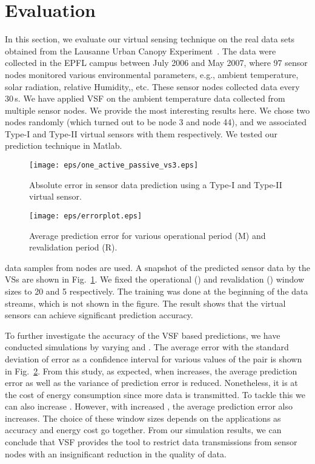 \documentclass[a4paper,conference]{IEEEtran}
\begin{document}
\section{Evaluation}
\label{eva}
In this section, we evaluate our virtual sensing technique on the real data sets obtained from the Lausanne Urban Canopy Experiment~\cite{sensorscope}. The data were collected in the EPFL campus between July 2006 and May 2007, where 97 sensor nodes monitored various environmental parameters, e.g., ambient temperature, solar radiation, relative Humidity,, etc. These sensor nodes collected data every 30\,s. We have applied VSF on the ambient temperature data collected from multiple sensor nodes. We provide the most interesting results here. We chose two nodes randomly (which turned out to be node 3 and node 44), and we associated Type-I and Type-II virtual sensors with them respectively. We tested our prediction technique in Matlab.
\begin{figure}[]
\centering
\texttt{[image: eps/one\_active\_passive\_vs3.eps]}
\caption{Absolute error in sensor data prediction using a Type-I and Type-II virtual sensor.}
\label{fig:prediction}
\end{figure}
\begin{figure}[]
\centering
\texttt{[image: eps/errorplot.eps]}
\caption{Average prediction error for various operational period (M) and revalidation period (R).}
\label{fig:errorplot}
\end{figure}
 data samples from nodes are used. A snapshot of the predicted sensor data by the VSs are shown in Fig.~\ref{fig:prediction}. We fixed the operational () and revalidation () window sizes to 20 and 5 respectively.  The training was done at the beginning of the data streams, which is not shown in the figure. The result shows that the virtual sensors can achieve significant prediction accuracy.

To further investigate the accuracy of the VSF based predictions, we have conducted simulations by varying  and . The average error with the standard deviation of error as a confidence interval for various values of the  pair is shown in Fig.~\ref{fig:errorplot}. From this study, as expected, when  increases, the average prediction error as well as the variance of prediction error is reduced. Nonetheless, it is at the cost of energy consumption since more data is transmitted. To tackle this we can also increase . However, with increased , the average prediction error also increases. The choice of these window sizes depends on the applications as accuracy and energy cost go together. From our simulation results, we can conclude that VSF provides the tool to restrict data transmissions from sensor nodes with an insignificant reduction in the quality of data.
\end{document}
